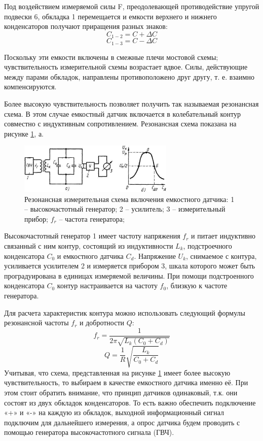 Под воздействием измеряемой силы F, преодолевающей противодействие упругой подвески 6, обкладка 1 перемещается и емкости верхнего и нижнего конденсаторов получают приращения разных знаков:
\begin{equation}
	\label{eq:e3}
	C_{1-2} = C + \Delta C
\end{equation}
\begin{equation}
	\label{eq:e4}
	C_{1-3} = C - \Delta C
\end{equation}

Поскольку эти емкости включены в смежные плечи мостовой схемы; чувствительность измерительной схемы возрастает вдвое. Силы, действующие между парами обкладок, направлены противоположено друг другу, т. е. взаимно компенсируются.

Более высокую чувствительность позволяет получить так называемая резонансная схема. В этом случае емкостный датчик включается в колебательный контур совместно с индуктивным сопротивлением. Резонансная схема показана на рисунке \ref{fig:sensor_scheme2}, а. 
\begin{figure}[ht]
	\centering
	\includegraphics[width=0.66\textwidth]{./images/sensor_scheme2.png}
	\caption{Резонансная измерительная схема включения емкостного датчика: 1 -- высокочастотный генератор; 2 -- усилитель; 3 -- измерительный прибор; \(f_r\) -- частота генератора;}
	\label{fig:sensor_scheme2}
\end{figure}

Высокочастотный генератор 1 имеет частоту напряжения \(f_r\) и питает индуктивно связанный с ним контур, состоящий из индуктивности \(L_k\), подстроечного конденсатора \(C_0\) и емкостного датчика \(C_{d}\). Напряжение \(U_k\), снимаемое с контура, усиливается усилителем 2 и измеряется прибором 3, шкала которого может быть проградуирована в единицах измеряемой величины. При помощи подстроенного конденсатора \(C_0\) контур настраивается на частоту \(f_0\), близкую к частоте генератора.

Для расчета характеристик контура можно использовать следующий формулы резонансной частоты \(f_r\) и добротности \(Q\): 
\begin{equation}
	\label{eq:freq}
	f_r = \frac{1}{2 \pi \sqrt{L_k(C_0 + C_d)}}
\end{equation}
\begin{equation}
	\label{eq:dobr}
	Q = \frac{1}{R} \sqrt{\frac{L_k}{C_0 + C_d}}
\end{equation}
Учитывая, что схема, представленная на рисунке \ref{fig:sensor_scheme2} имеет более высокую чувствительность, то выбираем в качестве емкостного датчика именно её. При этом стоит обратить внимание, что принцип датчиков одинаковый, т.к. они состоят из двух обкладок конденсаторов. То есть важно обеспечить подключение «+» и «-» на каждую из обкладок, выходной информационный сигнал подключим для дальнейшего измерения, а опрос датчика будем проводить с помощью генератора высокочастотного сигнала (ГВЧ).


